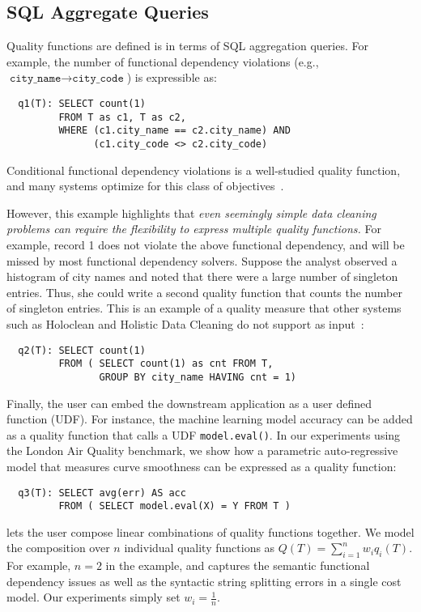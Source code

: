 \subsection{SQL Aggregate Queries}
Quality functions are defined is in terms of SQL aggregation queries. For example, the number of functional dependency violations (e.g., $\texttt{city\_name} \rightarrow \texttt{city\_code}$) is expressible as:
{\small\begin{lstlisting}
  q1(T): SELECT count(1)
         FROM T as c1, T as c2,
         WHERE (c1.city_name == c2.city_name) AND
               (c1.city_code <> c2.city_code)
\end{lstlisting}}
\noindent Conditional functional dependency violations is a well-studied quality function, and many systems optimize for this class of objectives~\cite{rekatsinas2017holoclean,DBLP:conf/sigmod/ChuIKW16}.   

However, this example highlights that \emph{even seemingly simple data cleaning problems can require the flexibility to express multiple quality functions.}   For example, record 1 does not violate the above functional dependency, and will be missed by most functional dependency solvers.  Suppose the analyst observed a histogram of city names and noted that there were a large number of singleton entries. Thus, she could write a second quality function that counts the number of singleton entries.  This is an example of a quality measure that other systems such as Holoclean and Holistic Data Cleaning do not support as input~\cite{rekatsinas2017holoclean,DBLP:conf/sigmod/ChuIKW16}:
{\small
\begin{lstlisting}
  q2(T): SELECT count(1)
         FROM ( SELECT count(1) as cnt FROM T,
                GROUP BY city_name HAVING cnt = 1)
\end{lstlisting}}
Finally, the user can embed the downstream application as a user defined function (UDF).  For instance, the machine learning model accuracy can be added as a quality function that calls a UDF \texttt{model.eval()}.  In our experiments using the London Air Quality benchmark, we show how a parametric auto-regressive model that measures curve smoothness can be expressed as a quality function:
{\small\begin{lstlisting}
  q3(T): SELECT avg(err) AS acc
         FROM ( SELECT model.eval(X) = Y FROM T )
\end{lstlisting}}
\noindent \sys lets the user compose linear combinations of quality functions together. We model the composition over $n$ individual quality functions as $Q(T) = \sum_{i=1}^n w_iq_i(T)$.  For example, $n=2$ in the example, and captures the semantic functional dependency issues as well as the syntactic string splitting errors in a single cost model.  Our experiments simply set $w_i=\frac{1}{n}$.


